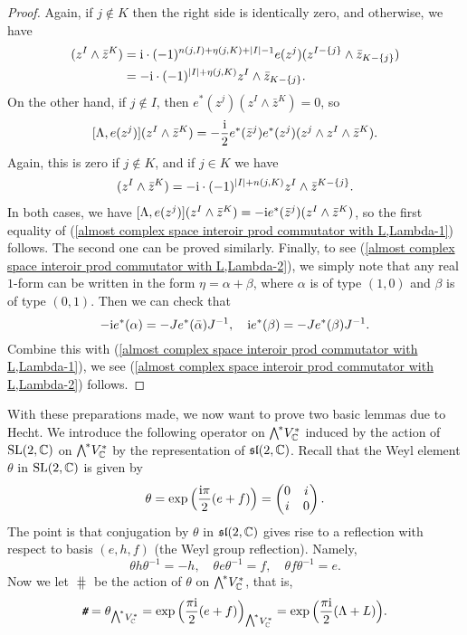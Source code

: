 \documentclass[11pt]{book}
\theoremstyle{definition}
\begin{document}
\begin{proof}
Again, if $j\notin K$ then the right side is identically zero, and otherwise, we have
\begin{align*}
[\Lambda,e(z^j)](z^I\wedge\bar{z}^K)&=\i\cdot(-1)^{n(j,I)+\eta(j,K)+|I|-1}e(z^j)(z^{I-\{j\}}\wedge\bar{z}_{K-\{j\}})\\
&=-\i\cdot(-1)^{|I|+\eta(j,K)}z^I\wedge\bar{z}_{K-\{j\}}.
\end{align*}
On the other hand, if $j\notin I$, then $e^*(z^j)(z^I\wedge\bar{z}^K)=0$, so
\[[\Lambda,e(z^j)](z^I\wedge\bar{z}^K)=-\frac{\mathrm{i}}{2}e^*(\bar{z}^j)e^*(z^j)(z^j\wedge z^I\wedge\bar{z}^K).\]
Again, this is zero if $j\notin K$, and if $j\in K$ we have
\begin{align*}
[\Lambda,e(z^j)](z^I\wedge\bar{z}^K)=-\i\cdot(-1)^{|I|+n(j,K)}z^I\wedge\bar{z}^{K-\{j\}}.
\end{align*}
In both cases, we have $[\Lambda,e(z^j)](z^I\wedge\bar{z}^K)=-\mathrm{i} e^*(\bar{z}^j)(z^I\wedge\bar{z}^K)$, so the first equality of (\ref{almost complex space interoir prod commutator with L,Lambda-1}) follows. The second one can be proved similarly. Finally, to see (\ref{almost complex space interoir prod commutator with L,Lambda-2}), we simply note that any real $1$-form can be written in the form $\eta=\alpha+\beta$, where $\alpha$ is of type $(1,0)$ and $\beta$ is of type $(0,1)$. Then we can check that
\[-\mathrm{i} e^*(\alpha)=-Je^*(\bar{\alpha})J^{-1},\quad \mathrm{i} e^*(\beta)=-Je^*(\beta)J^{-1}.\]
Combine this with (\ref{almost complex space interoir prod commutator with L,Lambda-1}), we see (\ref{almost complex space interoir prod commutator with L,Lambda-2}) follows.
\end{proof}
With these preparations made, we now want to prove two basic lemmas due to Hecht. We introduce the following operator on $\bigw^*V^*_{\C}$ induced by the action of $\mathrm{SL}(2,\mathbb{C})$ on $\bigw^*V^*_{\C}$ by the representation of $\mathfrak{sl}(2,\mathbb{C})$. Recall that the Weyl element $\theta$ in $\mathrm{SL}(2,\mathbb{C})$ is given by
\[\theta=\exp\Big(\frac{\mathrm{i}\pi}{2}(e+f)\Big)=\begin{pmatrix}
0&i\\
i&0
\end{pmatrix}.\]
The point is that conjugation by $\theta$ in $\mathfrak{sl}(2,\mathbb{C})$ gives rise to a reflection with respect to basis $(e,h,f)$ (the Weyl group reflection). Namely,
\[\theta h\theta^{-1}=-h,\quad \theta e\theta^{-1}=f,\quad \theta f\theta^{-1}=e.\]
Now we let $\hash$ be the action of $\theta$ on $\bigw^*V^*_{\C}$, that is,
\[\hash=\theta_{\bigw^*V^*_{\C}}=\exp\Big(\frac{\pi\i}{2}(e+f)\Big)_{\bigw^*V^*_{\C}}=\exp\Big(\frac{\pi\i}{2}(\Lambda+L)\Big).\]
\end{document}
